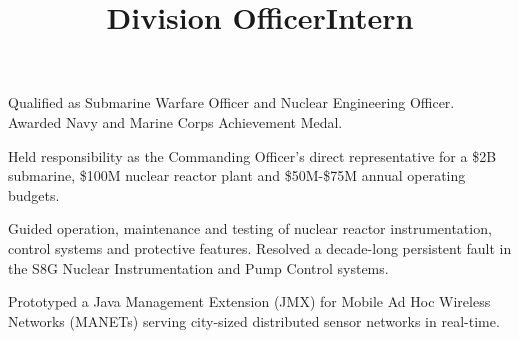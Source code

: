 \documentclass[line]{res}
\begin{document}
\begin{resume}
\title{\bf Division Officer}
\begin{position}
\vspace*{-.2cm}
\begin{list2}
	\item Qualified as Submarine Warfare Officer and Nuclear Engineering Officer. Awarded Navy and Marine Corps Achievement Medal.
	\item Held responsibility as the Commanding Officer's direct representative for a \$2B submarine, \$100M nuclear reactor plant and \$50M-\$75M annual operating budgets. 
	\item Guided operation, maintenance and testing of nuclear reactor instrumentation, control systems and protective features. Resolved a decade-long persistent fault in the S8G Nuclear Instrumentation and Pump Control systems. 
\end{list2}
\end{position}

\title{\bf Intern}
\begin{position}
\vspace*{-.2cm}
\begin{list2}
	\item Prototyped a Java Management Extension (JMX) for Mobile Ad Hoc Wireless Networks (MANETs) serving city-sized distributed sensor networks in real-time.
\end{list2}
\end{position}

\end{resume}
\end{document}
